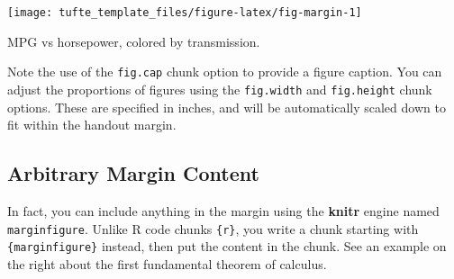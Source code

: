 \documentclass[a4paper,14pt]{tufte-handout}
\newenvironment{Shaded}{}{}
\newcommand{\AttributeTok}[1]{\textcolor[rgb]{0.49,0.56,0.16}{#1}}
\newcommand{\FunctionTok}[1]{\textcolor[rgb]{0.02,0.16,0.49}{#1}}
\newcommand{\NormalTok}[1]{#1}
\newcommand{\OtherTok}[1]{\textcolor[rgb]{0.00,0.44,0.13}{#1}}
\newcommand{\SpecialCharTok}[1]{\textcolor[rgb]{0.25,0.44,0.63}{#1}}
\newcommand{\StringTok}[1]{\textcolor[rgb]{0.25,0.44,0.63}{#1}}
\begin{document}
\begin{Shaded}
\end{Shaded}

\begin{marginfigure}

{\centering \texttt{[image: tufte\_template\_files/figure-latex/fig-margin-1]} 

}

\caption[MPG vs horsepower, colored by transmission]{MPG vs horsepower, colored by transmission.}\label{fig:fig-margin}
\end{marginfigure}

Note the use of the \texttt{fig.cap} chunk option to provide a figure
caption. You can adjust the proportions of figures using the
\texttt{fig.width} and \texttt{fig.height} chunk options. These are
specified in inches, and will be automatically scaled down to fit within
the handout margin.

\hypertarget{arbitrary-margin-content}{%
\subsection{Arbitrary Margin Content}\label{arbitrary-margin-content}}

In fact, you can include anything in the margin using the \textbf{knitr}
engine named \texttt{marginfigure}. Unlike R code chunks
\texttt{\textasciigrave{}\textasciigrave{}\textasciigrave{}\{r\}}, you
write a chunk starting with
\texttt{\textasciigrave{}\textasciigrave{}\textasciigrave{}\{marginfigure\}}
instead, then put the content in the chunk. See an example on the right
about the first fundamental theorem of calculus.
\end{document}
